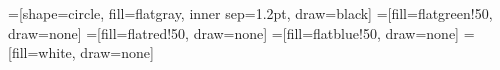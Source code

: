 =[shape=circle, fill=flatgray, inner sep=1.2pt, draw=black]
=[fill=flatgreen!50, draw=none]
=[fill=flatred!50, draw=none]
=[fill=flatblue!50, draw=none]
=[fill=white, draw=none]

\newcommand{\pointgrid}[4]{{
  \newcommand{\argxmin}{#1}
  \newcommand{\argxmax}{#2}
  \newcommand{\argymin}{#3}
  \newcommand{\argymax}{#4}

  \draw[] (\argxmin, 0) to (\argxmax, 0);
  \draw[] (0, \argymin) to (0, \argymax);
  \foreach \x in {\argxmin, ..., \argxmax} {
    \foreach \y in {\argymin, ..., \argymax} {
      \node[point] (\x-\y) at (\x, \y) {};
    }
  }
}}

\newcommand{\pointrect}[2]{
  \draw[#1] ($#2 + (-0.51, 0.51)$) rectangle ($#2 + (0.51, -0.51)$);
}

\newcommand{\subfigwidth}{0.48\textwidth}
\newcommand{\subfighspace}{0.3cm}
\newcommand{\tikzhspace}{0.4cm}
\newcommand{\tikzscale}{0.25}
\newcommand{\xmin}{-3}
\newcommand{\xmax}{3}
\newcommand{\ymin}{-3}
\newcommand{\ymax}{3}

